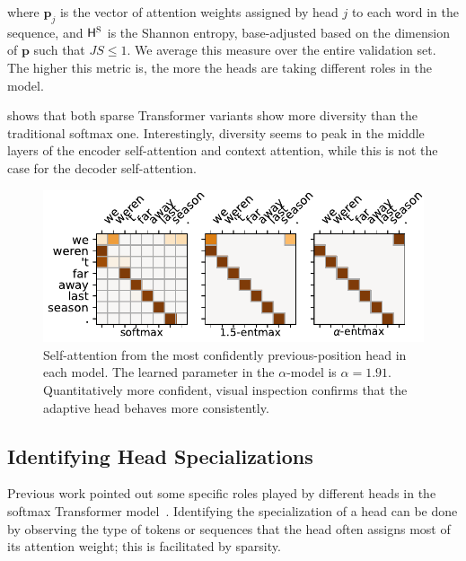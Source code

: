 where $\bm{p}_j$ is the vector of attention weights assigned by head
$j$ to each word in the sequence, and $\mathsf{H}^\textsc{S}$ is the Shannon entropy,
base-adjusted based on the dimension of $\bm{p}$ such that $JS \leq
    1$. We average this measure over the entire validation set. The
higher this metric is, the more the heads are taking different roles
in the model.

 shows that both sparse Transformer variants show
more diversity than the traditional softmax one. Interestingly,
diversity seems to peak in the middle layers of the encoder
self-attention and context attention, while this is not the case for
the decoder self-attention.

\begin{figure}[t]
    \centering
    \includegraphics[width=0.95\columnwidth]{Figures/head_prev.pdf}
    \caption{
        Self-attention from the most confidently previous-position head in
        each model. The learned parameter in the $\alpha$-\entmaxtext model
        is $\alpha=1.91$. Quantitatively more confident, visual inspection
        confirms that the adaptive head behaves more consistently.}
    \label{fig:head_prev}
\end{figure}

\subsection{Identifying Head Specializations}\label{sec:spec}

Previous work pointed out some specific roles played by
different heads in the softmax Transformer
model~\citep{voita2018context,tang2018why,specialized}. Identifying
the specialization of a head can be done by observing the
type of tokens or sequences that the head often assigns most
of its attention weight; this is facilitated by sparsity.

